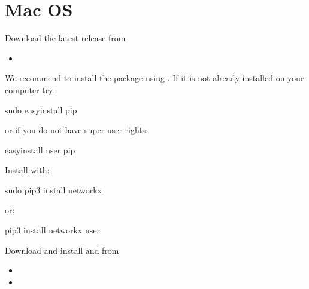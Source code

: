 \documentclass[letterpaper,10pt,english]{sphinxmanual}
\begin{document}
\section{Mac OS}
\label{\detokenize{Installation:mac-os}}
Download the latest release from
\begin{itemize}
\item {} 

\end{itemize}

We recommend to install the package using . If it is not already installed on your computer try:

\begin{sphinxVerbatim}[commandchars=\\\{\}]
\PYGZdl{} sudo easy\PYGZus{}install pip
\end{sphinxVerbatim}

or if you do not have super user rights:

\begin{sphinxVerbatim}[commandchars=\\\{\}]
\PYGZdl{} easy\PYGZus{}install \PYGZhy{}\PYGZhy{}user pip
\end{sphinxVerbatim}

Install  with:

\begin{sphinxVerbatim}[commandchars=\\\{\}]
\PYGZdl{} sudo pip3 install networkx
\end{sphinxVerbatim}

or:

\begin{sphinxVerbatim}[commandchars=\\\{\}]
\PYGZdl{} pip3 install networkx \PYGZhy{}\PYGZhy{}user
\end{sphinxVerbatim}

Download and install  and  from
\begin{itemize}
\item {} 

\item {} 

\end{itemize}
\end{document}
